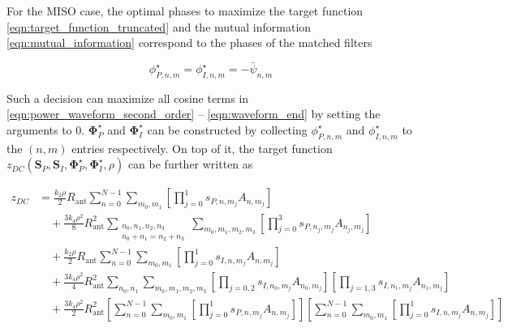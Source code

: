 For the MISO case, the optimal phases to maximize the target function \eqref{eqn:target_function_truncated} and the mutual information \eqref{eqn:mutual_information} correspond to the phases of the matched filters

\begin{equation}\label{eqn:optimal_phases}
  \phi _{P,n,m}^ \star  = \phi _{I,n,m}^ \star  =  - {{\bar \psi }_{n,m}}
\end{equation}

Such a decision can maximize all cosine terms in \eqref{eqn:power_waveform_second_order} -- \eqref{eqn:waveform_end} by setting the arguments to 0. ${\mathbf{\Phi }}_P^ \star $ and ${\mathbf{\Phi }}_I^ \star $ can be constructed by collecting $\phi _{P,n,m}^ \star $ and $\phi _{I,n,m}^ \star $ to the $(n,m)$ entries respectively. On top of it, the target function ${z_{DC}}\left( {{{\mathbf{S}}_P},{{\mathbf{S}}_I},{\mathbf{\Phi }}_P^ \star ,{\mathbf{\Phi }}_I^ \star ,\rho } \right)$ can be further written as

\begin{align}\label{eqn:target_posynomial}
  {z_{DC}} &= \frac{{{k_2}\rho }}{2}{R_{{\text{ant}}}}\sum\limits_{n = 0}^{N - 1} {\sum\limits_{{m_0},{m_1}} {\left[ {\prod\limits_{j = 0}^1 {{s_{P,n,{m_j}}}} {A_{n,{m_j}}}} \right]} } \nonumber \\
   &\quad + \frac{{3{k_4}{\rho ^2}}}{8}R_{{\text{ant}}}^2\sum\limits_{\substack{ {n_0},{n_1},{n_2},{n_3} \\ {n_0} + {n_1} = {n_2} + {n_3} } }  {\sum\limits_{{m_0},{m_1},{m_2},{m_3}} {\left[ {\prod\limits_{j = 0}^3 {{s_{P,{n_j},{m_j}}}{A_{{n_j},{m_j}}}} } \right]} } \nonumber \\
   &\quad + \frac{{{k_2}\rho }}{2}{R_{{\text{ant}}}}\sum\limits_{n = 0}^{N - 1} {\sum\limits_{{m_0},{m_1}} {\left[ {\prod\limits_{j = 0}^1 {{s_{I,n,{m_j}}}} {A_{n,{m_j}}}} \right]} } \nonumber \\
   &\quad + \frac{{3{k_4}{\rho ^2}}}{4}R_{{\text{ant}}}^2\sum\limits_{{n_0},{n_1}} {\sum\limits_{{m_0},{m_1},{m_2},{m_3}} {\left[ {\prod\limits_{j = 0,2} {{s_{I,{n_0},{m_j}}}{A_{{n_0},{m_j}}}} } \right]\left[ {\prod\limits_{j = 1,3} {{s_{I,{n_1},{m_j}}}{A_{{n_1},{m_j}}}} } \right]} } \nonumber \\
   &\quad + \frac{{3{k_4}{\rho ^2}}}{2}R_{\text{ant}}^2\left[ {\sum\limits_{n = 0}^{N - 1} {\sum\limits_{{m_0},{m_1}} {\left[ {\prod\limits_{j = 0}^1 {{s_{P,n,{m_j}}}} {A_{n,{m_j}}}} \right]} } } \right]\left[ {\sum\limits_{n = 0}^{N - 1} {\sum\limits_{{m_0},{m_1}} {\left[ {\prod\limits_{j = 0}^1 {{s_{I,n,{m_j}}}} {A_{n,{m_j}}}} \right]} } } \right]
\end{align}

